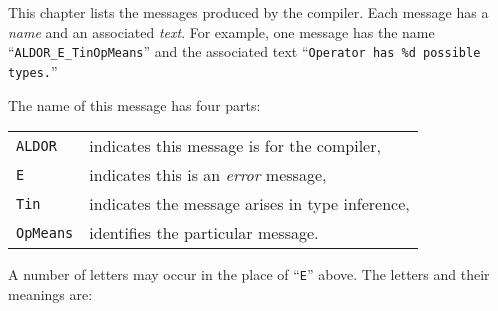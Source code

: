 %
\vspace{1mm}
This chapter lists the messages produced by the
\asharp{} compiler.
Each message has a {\em name} and an associated {\em text}.
For example, one message has the name ``{\tt ALDOR\_E\_TinOpMeans}''
and the associated text ``{\tt Operator has \%d possible types.}''

\vspace{1mm}
The name of this message has four parts:

\vspace{1mm}
\begin{tabular}{@{}ll@{}}   %
{\tt ALDOR}      & indicates this message is for the \asharp{} compiler, \\
{\tt E}       & indicates this is an {\em error\/} message, \\
{\tt Tin}     & indicates the message arises in type inference, \\
{\tt OpMeans} & identifies the particular message.
\end{tabular}

\vspace{1mm}
A number of letters may occur in the place of ``{\tt E}'' above.
The letters and their meanings are:

